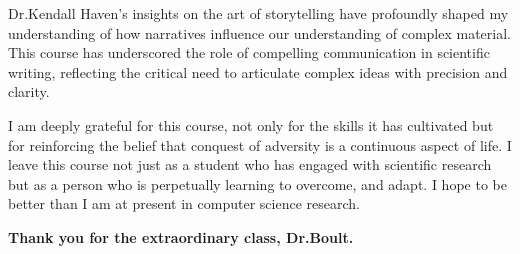 \documentclass[10pt]{article}
\begin{document}
Dr.Kendall Haven's insights on the art of storytelling have profoundly shaped my understanding of how narratives influence our understanding of complex material. This course has underscored the role of compelling communication in scientific writing, reflecting the critical need to articulate complex ideas with precision and clarity.

I am deeply grateful for this course, not only for the skills it has cultivated but for reinforcing the belief that conquest of adversity is a continuous aspect of life. I leave this course not just as a student who has engaged with scientific research but as a person who is perpetually learning to overcome, and adapt. I hope to be better than I am at present in computer science research.

\bigskip

\begin{center}
    \noindent\textbf{Thank you for the extraordinary class, Dr.Boult.}
\end{center}
\end{document}
